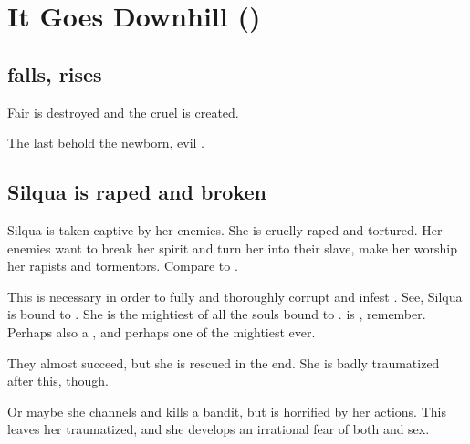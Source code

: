 \section{It Goes Downhill ()}
\subsection{\Kezerad{} falls, \iquin{} rises}
Fair \Kezerad{} is destroyed and the cruel \iquin{} is created. 

The last \Kezeradi{} behold the newborn, evil \iquin. 










\subsection{Silqua is raped and broken}
Silqua is taken captive by her enemies. 
She is cruelly raped and tortured. 
Her enemies want to break her spirit and turn her into their slave, make her worship her rapists and tormentors. 
Compare to \cite{GeorgeOrwell:1984}. 

This is necessary in order to fully and thoroughly corrupt and infest \iquin. 
See, Silqua is bound to \iquin. 
She is the mightiest of all the souls bound to \iquin. 
\Aryal{} is \Kezeradi{}, remember. 
Perhaps also a \sathariah, and perhaps one of the mightiest \resviel{} ever. 

They almost succeed, but she is rescued in the end. 
She is badly traumatized after this, though. 

Or maybe she channels \nieur{} and kills a bandit, but is horrified by her actions. 
This leaves her traumatized, and she develops an irrational fear of both \nieur{} and sex. 






